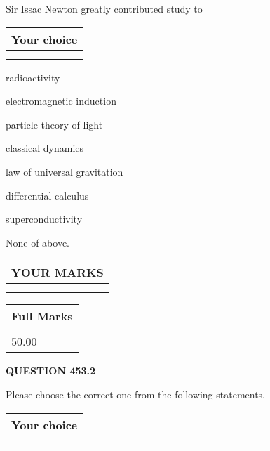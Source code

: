 \documentclass[12pt]{article}
\begin{document}
  
Sir Issac Newton greatly contributed study to
  
  
\noindent\hspace{3.0in} \begin{tabular}{|l|}
\hline
Your choice \\
\hline
 \\ 
 \\ 
\hline
\end{tabular}
  
  
 
 
radioactivity
 
 
electromagnetic induction
 
 
particle theory of light
 
 
classical dynamics
 
 
law of universal gravitation
 
 
differential calculus
 
 
superconductivity
 
 
 None of above.
 
 
  
\vspace{0.2in}
  
\noindent\begin{tabular}{|l|}
\hline
 YOUR MARKS  \\
\hline
 \\ 
 \\ 
\hline
\end{tabular}
\hspace{0.05in} \begin{tabular}{|l|}
\hline
 Full Marks  \\
\hline
 \\ 
50.00 \\
\hline
\end{tabular}
{\textbf{\Large{QUESTION
453.2 
}}}
  
  
Please choose the correct one from the following statements.
  
  
\noindent\hspace{3.0in} \begin{tabular}{|l|}
\hline
Your choice \\
\hline
 \\ 
 \\ 
\hline
\end{tabular}
  
\end{document}
